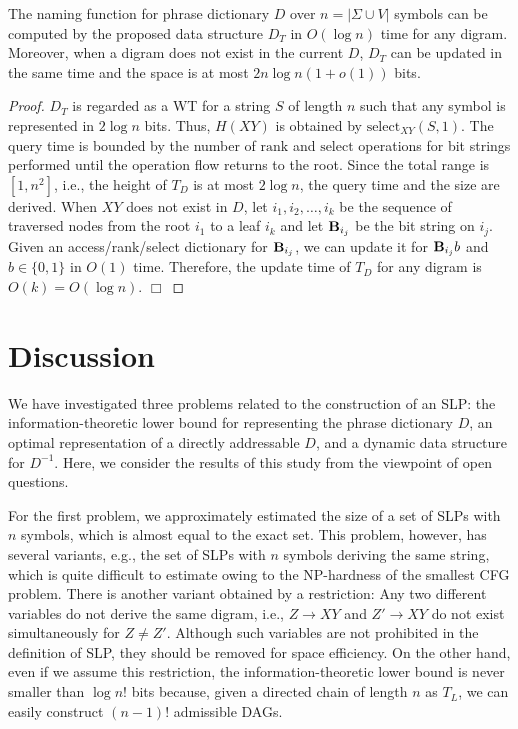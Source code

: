 \documentclass[10pt]{llncs}
\begin{document}
\begin{theorem}\label{wavelet-th}
The naming function for phrase dictionary $D$ over $n=|\Sigma\cup V|$ 
symbols can be computed by the proposed data structure $D_T$
in $O(\log n)$ time for any digram.
Moreover, when a digram does not exist in the current $D$,
$D_T$ can be updated in the same time and 
the space is at most $2n\log n(1+o(1))$ bits.
\end{theorem}
\begin{proof}
$D_T$ is regarded as a WT for 
a string $S$ of length $n$ such that any symbol is represented 
in $2\log n$ bits.
Thus, $H(XY)$ is obtained by $\mbox{select}_{XY}(S,1)$.
The query time is bounded by the number of
$\mbox{rank}$ and $\mbox{select}$ operations for bit strings
performed until the operation flow returns to the root.
Since the total range is $[1,n^2]$, i.e., the height of $T_D$ is at most $2\log n$,
the query time and the size are derived.
When $XY$ does not exist in $D$,
let $i_1,i_2,\ldots,i_k$ be the sequence of traversed nodes from the root $i_1$ to
a leaf $i_k$ and let ${\bf B}_{i_j}$ be the bit string on $i_j$. 
Given an access/rank/select dictionary for ${\bf B}_{i_j}$,
we can update it for ${\bf B}_{i_j}b$ and $b\in\{0,1\}$ in $O(1)$ time.
Therefore, the update time of $T_D$ for any digram is $O(k)=O(\log n)$.
\hspace{\fill}$\Box$
\end{proof}

\section{Discussion}

We have investigated three problems related to the construction of an SLP:
the information-theoretic lower bound for representing the phrase dictionary $D$,
an optimal representation of a directly addressable $D$,
and a dynamic data structure for $D^{-1}$.
Here, we consider the results of this study from the viewpoint of open questions.

For the first problem, we approximately estimated 
the size of a set of SLPs with $n$ symbols, which is
almost equal to the exact set.
This problem, however, has several variants, e.g.,
the set of SLPs with $n$ symbols deriving the same string,
which is quite difficult to estimate owing to the NP-hardness of the smallest CFG problem.
There is another variant obtained by a restriction:
Any two different variables do not derive the same digram, i.e.,
$Z\to XY$ and $Z'\to XY$ do not exist simultaneously for $Z\neq Z'$.
Although such variables are not prohibited in the definition of SLP,
they should be removed for space efficiency.
On the other hand, even if we assume this restriction,
the information-theoretic lower bound is never smaller than $\log n!$ bits because, 
given a directed chain of length $n$ as $T_L$,
we can easily construct $(n-1)!$ admissible DAGs.
\end{document}
